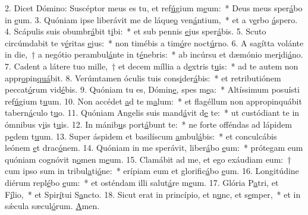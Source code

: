 2. Dicet Dómino: Suscéptor meus es tu, et ref\uline{ú}gium m\uline{e}um:~* Deus meus sper\uline{á}bo in \uline{e}um.
3. Quóniam ipse liberávit me de láque\uline{o} ven\uline{á}ntium,~* et a v\uline{e}rbo \uline{á}spero.
4. Scápulis suis obumbr\uline{á}bit t\uline{i}bi:~* et sub pennis \uline{e}jus sper\uline{á}bis.
5. Scuto circúmdabit te v\uline{é}ritas \uline{e}jus:~* non timébis a tim\uline{ó}re noct\uline{ú}rno.
6. A sagítta volánte in die,~† a negótio perambul\uline{á}nte in t\uline{é}nebris:~* ab incúrsu et dæmónio mer\uline{i}di\uline{á}no.
7. Cadent a látere tuo mille,~† et decem míllia a d\uline{e}xtris t\uline{u}is:~* ad te autem non appr\uline{o}pin\uline{quá}bit.
8. Verúmtamen óculis tuis cons\uline{i}der\uline{á}bis:~* et retributiónem peccat\uline{ó}rum vid\uline{é}bis.
9. Quóniam tu es, Dómin\uline{e}, spes m\uline{e}a:~* Altíssimum posuísti ref\uline{ú}gium t\uline{u}um.
10. Non accédet \uline{a}d te m\uline{a}lum:~* et flagéllum non appropinquábit tabern\uline{á}culo t\uline{u}o.
11. Quóniam Angelis suis mand\uline{á}vit d\uline{e} te:~* ut custódiant te in ómnibus v\uline{i}is t\uline{u}is.
12. In mánib\uline{u}s port\uline{á}bunt te:~* ne forte offéndas ad lápidem p\uline{e}dem t\uline{u}um.
13. Super áspidem et basilíscum \uline{a}mbul\uline{á}bis:~* et conculcábis leónem \uline{e}t drac\uline{ó}nem.
14. Quóniam in me sperávit, liber\uline{á}bo \uline{e}um:~* prótegam eum quóniam cognóvit n\uline{o}men m\uline{e}um.
15. Clamábit ad me, et ego exáudiam eum:~† cum ipso sum in tribul\uline{a}ti\uline{ó}ne:~* erípiam eum et glorific\uline{á}bo \uline{e}um.
16. Longitúdine diérum repl\uline{é}bo \uline{e}um:~* et osténdam illi salut\uline{á}re m\uline{e}um.
17. Glória P\uline{a}tri, et F\uline{í}lio,~* et Spir\uline{í}tui S\uline{a}ncto.
18. Sicut erat in princípio, et n\uline{u}nc, et s\uline{e}mper,~* et in sǽcula sæcul\uline{ó}rum. \uline{A}men.
